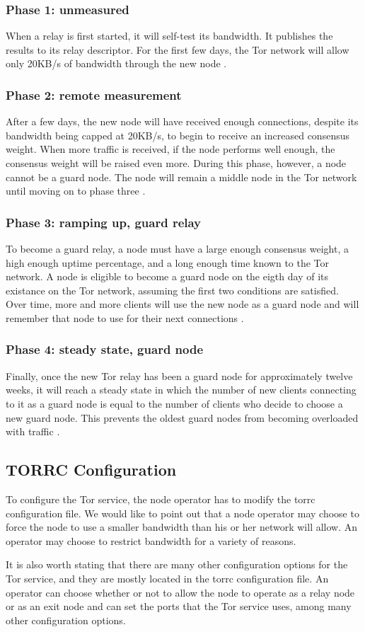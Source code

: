 \documentclass[12pt,journal]{IEEEtran}
\begin{document}
\subsubsection{Phase 1: unmeasured}
When a relay is first started, it will self-test its bandwidth. It publishes the results to its relay descriptor. For the first few days, the Tor network will allow only 20KB/s of bandwidth through the new node \cite{arma2013}.
\subsubsection{Phase 2: remote measurement}
After a few days, the new node will have received enough connections, despite its bandwidth being capped at 20KB/s, to begin to receive an increased consensus weight. When more traffic is received, if the node performs well enough, the consensus weight will be raised even more. During this phase, however, a node cannot be a guard node. The node will remain a middle node in the Tor network until moving on to phase three \cite{arma2013}.
\subsubsection{Phase 3: ramping up, guard relay}
To become a guard relay, a node must have a large enough consensus weight, a high enough uptime percentage, and a long enough time known to the Tor network. A node is eligible to become a guard node on the eigth day of its existance on the Tor network, assuming the first two conditions are satisfied. Over time, more and more clients will use the new node as a guard node and will remember that node to use for their next connections \cite{arma2013}.
\subsubsection{Phase 4: steady state, guard node}
Finally, once the new Tor relay has been a guard node for approximately twelve weeks, it will reach a steady state in which the number of new clients connecting to it as a guard node is equal to the number of clients who decide to choose a new guard node. This prevents the oldest guard nodes from becoming overloaded with traffic \cite{arma2013}.
\subsection{TORRC Configuration}
To configure the Tor service, the node operator has to modify the torrc configuration file. We would like to point out that a node operator may choose to force the node to use a smaller bandwidth than his or her network will allow. An operator may choose to restrict bandwidth for a variety of reasons.
\par
It is also worth stating that there are many other configuration options for the Tor service, and they are mostly located in the torrc configuration file. An operator can choose whether or not to allow the node to operate as a relay node or as an exit node and can set the ports that the Tor service uses, among many other configuration options.
\end{document}
